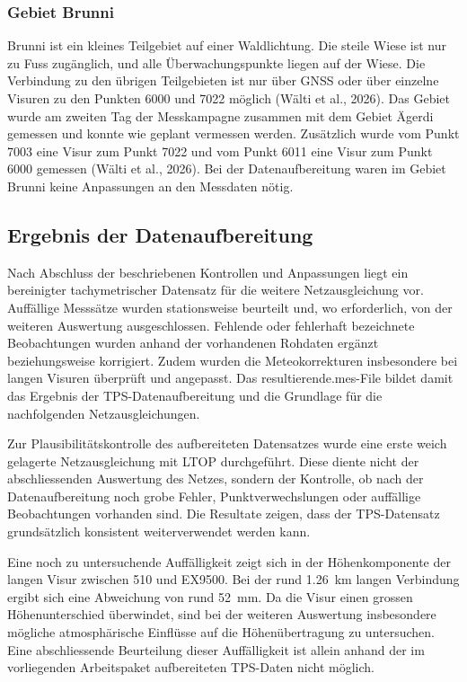 \subsubsection{Gebiet Brunni}
\label{sec:gebiet-brunni}
Brunni ist ein kleines Teilgebiet auf einer Waldlichtung. Die steile
Wiese ist nur zu Fuss zugänglich, und alle Überwachungspunkte liegen auf
der Wiese. Die Verbindung zu den übrigen Teilgebieten ist nur über GNSS
oder über einzelne Visuren zu den Punkten 6000 und 7022 möglich (Wälti et al., 2026). Das Gebiet wurde am zweiten Tag der
Messkampagne zusammen mit dem Gebiet Ägerdi gemessen und konnte wie
geplant vermessen werden. Zusätzlich wurde vom Punkt 7003 eine Visur
zum Punkt 7022 und vom Punkt 6011 eine Visur zum Punkt 6000 gemessen
(Wälti et al., 2026). Bei der Datenaufbereitung waren im
Gebiet Brunni keine Anpassungen an den Messdaten nötig.

\subsection{Ergebnis der Datenaufbereitung}
\label{sec:ergebnis_der_datenaufbereitung}

Nach Abschluss der beschriebenen Kontrollen und Anpassungen liegt ein
bereinigter tachymetrischer Datensatz für die weitere Netzausgleichung
vor. Auffällige Messsätze wurden stationsweise beurteilt und, wo
erforderlich, von der weiteren Auswertung ausgeschlossen. Fehlende oder
fehlerhaft bezeichnete Beobachtungen wurden anhand der vorhandenen
Rohdaten ergänzt beziehungsweise korrigiert. Zudem wurden die
Meteokorrekturen insbesondere bei langen Visuren überprüft und
angepasst. Das resultierende.mes-File bildet damit das
Ergebnis der TPS-Datenaufbereitung und die Grundlage für die
nachfolgenden Netzausgleichungen.

Zur Plausibilitätskontrolle des aufbereiteten Datensatzes wurde eine
erste weich gelagerte Netzausgleichung mit LTOP durchgeführt. Diese
diente nicht der abschliessenden Auswertung des Netzes, sondern der
Kontrolle, ob nach der Datenaufbereitung noch grobe Fehler,
Punktverwechslungen oder auffällige Beobachtungen vorhanden sind.
Die Resultate zeigen, dass der TPS-Datensatz grundsätzlich konsistent
weiterverwendet werden kann.

Eine noch zu untersuchende Auffälligkeit zeigt sich in der
Höhenkomponente der langen Visur zwischen 510 und EX9500. Bei der rund
1.26~km langen Verbindung ergibt sich eine Abweichung von rund 52~mm.
Da die Visur einen grossen Höhenunterschied überwindet, sind bei der
weiteren Auswertung insbesondere mögliche atmosphärische Einflüsse auf
die Höhenübertragung zu untersuchen. Eine abschliessende Beurteilung
dieser Auffälligkeit ist allein anhand der im vorliegenden Arbeitspaket
aufbereiteten TPS-Daten nicht möglich.

